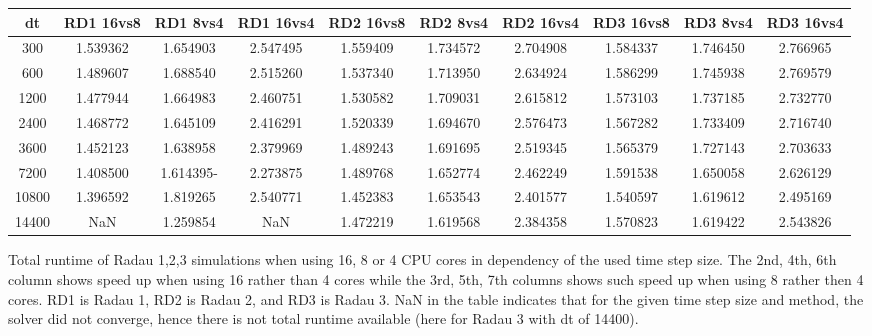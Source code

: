 \documentclass[a4paper, 12pt]{article}
\newcommand{\checkit}[1]{{\color{red}#1}}
\begin{document}
\begin{scriptsize}
\begin{tabular}{c|c|c|c||c|c|c||c|c|c}
 dt & RD1 16vs8   & RD1  8vs4  & RD1 16vs4 & RD2 16vs8   & RD2  8vs4 & RD2 16vs4 &   RD3 16vs8
 & RD3  8vs4  & RD3 16vs4\\ \hline
   300  &   1.539362 & 1.654903 &2.547495 &  1.559409 & 1.734572 & 2.704908 & 1.584337 &  1.746450  & 2.766965\\
   600  &   1.489607 & 1.688540 & 2.515260& 1.537340 & 1.713950 & 2.634924 &   1.586299 & 1.745938  &2.769579 \\
  1200  &   1.477944 & 1.664983 & 2.460751& 1.530582 & 1.709031 & 2.615812 & 1.573103 & 1.737185 &2.732770 \\
  2400  &  1.468772 & 1.645109  & 2.416291& 1.520339 & 1.694670 & 2.576473 & 1.567282 & 1.733409 & 2.716740\\
  3600  &  1.452123 & 1.638958  & 2.379969& 1.489243 & 1.691695 & 2.519345 & 1.565379 & 1.727143 & 2.703633\\
  7200  & 1.408500 & 1.614395-  & 2.273875&  1.489768&  1.652774 & 2.462249 & 1.591538 & 1.650058 & 2.626129\\
 10800 &   1.396592 & 1.819265  & 2.540771& 1.452383 & 1.653543 & 2.401577 & 1.540597 & 1.619612 &2.495169 \\
 14400 &  NaN      &  1.259854 & NaN & 1.472219 & 1.619568 & 2.384358 &  1.570823 & 1.619422  &2.543826
\end{tabular}
\end{scriptsize}
{Total runtime of Radau 1,2,3 simulations when using 16, 8 or 4 CPU cores in dependency of the used time step size.
\checkit{The 2nd, 4th, 6th column shows speed up when using 16 rather than 4 cores while the 3rd, 5th, 7th columns shows such speed up when using 8 rather then 4 cores. RD1 is Radau 1, RD2 is Radau 2, and RD3 is Radau 3. NaN in the table indicates that for the given time step size and method, the solver did not converge, hence there is not total runtime available (here for Radau 3 with dt of 14400).}}
\end{document}
